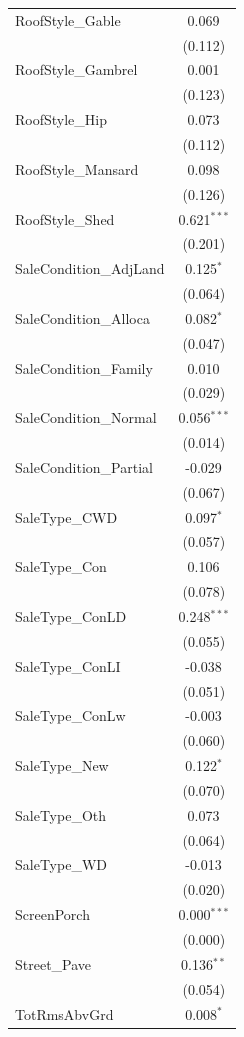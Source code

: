 \begin{table}[!htbp]
\begin{tabular}{@{\extracolsep{5pt}}lc}
 RoofStyle_Gable & 0.069$^{}$ \\
& (0.112) \\
 RoofStyle_Gambrel & 0.001$^{}$ \\
& (0.123) \\
 RoofStyle_Hip & 0.073$^{}$ \\
& (0.112) \\
 RoofStyle_Mansard & 0.098$^{}$ \\
& (0.126) \\
 RoofStyle_Shed & 0.621$^{***}$ \\
& (0.201) \\
 SaleCondition_AdjLand & 0.125$^{*}$ \\
& (0.064) \\
 SaleCondition_Alloca & 0.082$^{*}$ \\
& (0.047) \\
 SaleCondition_Family & 0.010$^{}$ \\
& (0.029) \\
 SaleCondition_Normal & 0.056$^{***}$ \\
& (0.014) \\
 SaleCondition_Partial & -0.029$^{}$ \\
& (0.067) \\
 SaleType_CWD & 0.097$^{*}$ \\
& (0.057) \\
 SaleType_Con & 0.106$^{}$ \\
& (0.078) \\
 SaleType_ConLD & 0.248$^{***}$ \\
& (0.055) \\
 SaleType_ConLI & -0.038$^{}$ \\
& (0.051) \\
 SaleType_ConLw & -0.003$^{}$ \\
& (0.060) \\
 SaleType_New & 0.122$^{*}$ \\
& (0.070) \\
 SaleType_Oth & 0.073$^{}$ \\
& (0.064) \\
 SaleType_WD & -0.013$^{}$ \\
& (0.020) \\
 ScreenPorch & 0.000$^{***}$ \\
& (0.000) \\
 Street_Pave & 0.136$^{**}$ \\
& (0.054) \\
 TotRmsAbvGrd & 0.008$^{*}$ \\

\end{tabular}
\end{table}
